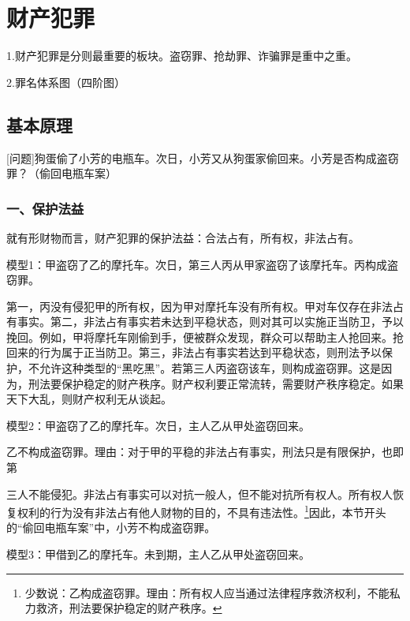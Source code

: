 \chapter{财产犯罪}

\begin{EditionOpeningPanel}
1.财产犯罪是分则最重要的板块。盗窃罪、抢劫罪、诈骗罪是重中之重。

2.罪名体系图（四阶图）

\end{EditionOpeningPanel}

\section{基本原理}

[问题]狗蛋偷了小芳的电瓶车。次日，小芳又从狗蛋家偷回来。小芳是否构成盗窃罪？（偷回电瓶车案）

\subsection*{一、保护法益}

就有形财物而言，财产犯罪的保护法益：合法占有，所有权，非法占有。

模型1：甲盗窃了乙的摩托车。次日，第三人丙从甲家盗窃了该摩托车。丙构成盗窃罪。

第一，丙没有侵犯甲的所有权，因为甲对摩托车没有所有权。甲对车仅存在非法占有事实。第二，非法占有事实若未达到平稳状态，则对其可以实施正当防卫，予以挽回。例如，甲将摩托车刚偷到手，便被群众发现，群众可以帮助主人抢回来。抢回来的行为属于正当防卫。第三，非法占有事实若达到平稳状态，则刑法予以保护，不允许这种类型的“黑吃黑”。若第三人丙盗窃该车，则构成盗窃罪。这是因为，刑法要保护稳定的财产秩序。财产权利要正常流转，需要财产秩序稳定。如果天下大乱，则财产权利无从谈起。

模型2：甲盗窃了乙的摩托车。次日，主人乙从甲处盗窃回来。

乙不构成盗窃罪。理由：对于甲的平稳的非法占有事实，刑法只是有限保护，也即第

三人不能侵犯。非法占有事实可以对抗一般人，但不能对抗所有权人。所有权人恢复权利的行为没有非法占有他人财物的目的，不具有违法性。\footnote{少数说：乙构成盗窃罪。理由：所有权人应当通过法律程序救济权利，不能私力救济，刑法要保护稳定的财产秩序。}因此，本节开头的“偷回电瓶车案”中，小芳不构成盗窃罪。

模型3：甲借到乙的摩托车。未到期，主人乙从甲处盗窃回来。

